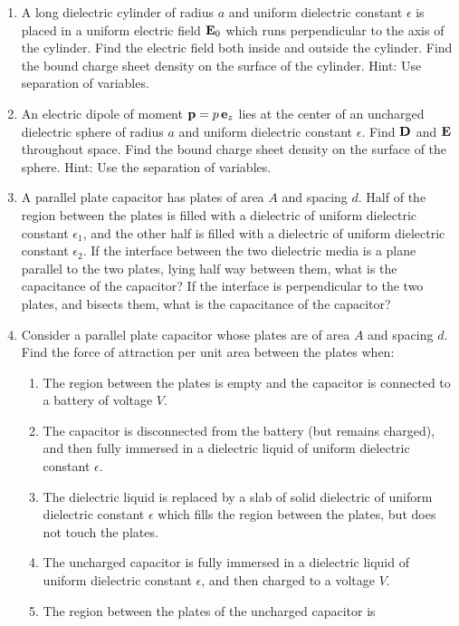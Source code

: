 {\begin{enumerate}
dielectric constant $\epsilon_2$ and outer radius $c$, surrounded
by an outer conductor. All components of the cable are touching. What
is the capacitance per unit length of the cable?
\item A long dielectric cylinder of radius $a$ and uniform dielectric constant
$\epsilon$ is placed in a uniform electric field ${\bf E}_0$ which
runs perpendicular to the axis of the cylinder. Find the electric
field both inside and outside the cylinder. Find the bound charge sheet
density on the surface of the cylinder. Hint: Use separation of variables.
\item An electric dipole of moment ${\bf p} = p\,{\bf e}_z$ lies at the center of an  uncharged dielectric sphere of radius $a$
and uniform dielectric constant $\epsilon$. Find ${\bf D}$ and ${\bf E}$
throughout space. Find the bound charge sheet density on the surface of the
sphere. Hint: Use the separation of variables.
\item A parallel plate capacitor has plates of area $A$ and spacing $d$.
Half of the region between the plates is filled with a dielectric
of uniform dielectric constant $\epsilon_1$, and the other half is
filled with a dielectric of uniform dielectric constant $\epsilon_2$. 
If the interface between the two dielectric media is a plane parallel to
the two plates, lying half way between them, what is the capacitance of
the capacitor? If the interface is perpendicular to the two plates, and
bisects them, what is the capacitance of the capacitor?
\item Consider a parallel plate capacitor whose plates are of
area $A$ and spacing $d$. Find the force of attraction per unit area between
the plates when:
\begin{enumerate}
\item The region between the plates is empty and the capacitor is
connected to a battery of voltage $V$.
\item The capacitor is disconnected from the battery (but remains charged),
and then fully immersed in a dielectric liquid of uniform dielectric constant $\epsilon$.
\item The dielectric liquid is replaced by a slab of
solid dielectric of uniform dielectric constant $\epsilon$ which fills the
region between the plates, but does not touch the plates.
\item The uncharged capacitor is fully immersed in a dielectric liquid of uniform dielectric constant $\epsilon$, and then charged to a voltage $V$.
\item The region between the plates of the uncharged capacitor is

\end{enumerate}
\end{enumerate}}
